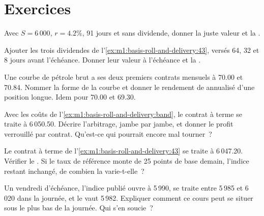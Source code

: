 \section{Exercices}

\begin{exercise}[$\star$]\label{exo:m1:basis-roll-and-delivery:1}
Avec $S = 6\,000$, $r = 4.2\%$, 91 jours et sans dividende, donner la juste valeur
et la .
\end{exercise}

\begin{exercise}[$\star$]\label{exo:m1:basis-roll-and-delivery:2}
Ajouter les trois dividendes de l'\cref{ex:m1:basis-roll-and-delivery:43}, versés 64,
32 et 8 jours avant l'échéance. Donner leur valeur à l'échéance et la .
\end{exercise}

\begin{exercise}[$\star$]\label{exo:m1:basis-roll-and-delivery:3}
Une courbe de pétrole brut a ses deux premiers contrats mensuels à 70.00 et 70.84.
Nommer la forme de la courbe et donner le rendement de  annualisé d'une position longue. Idem
pour 70.00 et 69.30.
\end{exercise}

\begin{exercise}[$\star\star$]\label{exo:m1:basis-roll-and-delivery:4}
Avec les coûts de l'\cref{ex:m1:basis-roll-and-delivery:band}, le contrat à terme se
traite à 6\,050.50. Décrire l'arbitrage, jambe par jambe, et donner le
profit verrouillé par contrat. Qu'est-ce qui pourrait encore mal tourner~?
\end{exercise}

\begin{exercise}[$\star\star$]\label{exo:m1:basis-roll-and-delivery:5}
Le contrat à terme de l'\cref{ex:m1:basis-roll-and-delivery:43} se traite à 6\,047.20.
Vérifier le . Si le taux de référence monte de 25 points de base
demain, l'indice restant inchangé, de combien la  varie-t-elle~?
\end{exercise}

\begin{exercise}[$\star\star$]\label{exo:m1:basis-roll-and-delivery:6}
Un vendredi d'échéance, l'indice publié ouvre à 5\,990, se traite entre
5\,985 et 6\,020 dans la journée, et le 
vaut 5\,982. Expliquer comment ce cours peut se situer sous le plus bas de la journée. Qui s'en soucie~?
\end{exercise}

